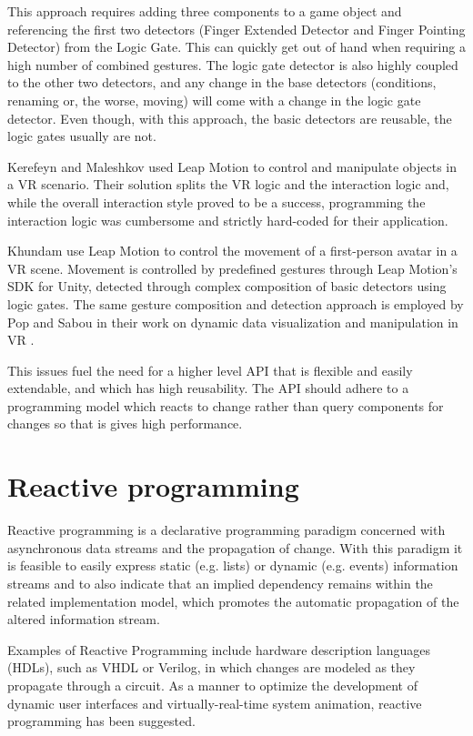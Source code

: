 \documentclass[12pt,a4paper,twoside]{report}
\begin{document}
This approach requires adding three components to a game object and referencing the first two detectors (Finger Extended Detector and Finger Pointing Detector) from the Logic Gate. This can quickly get out of hand when requiring a high number of combined gestures. The logic gate detector is also highly coupled to the other two detectors, and any change in the base detectors (conditions, renaming or, the worse, moving) will come with a change in the logic gate detector. Even though, with this approach, the basic detectors are reusable, the logic gates usually are not.

Kerefeyn and Maleshkov \cite{Kerefeyn} used Leap Motion to control and manipulate objects in a VR scenario. Their solution splits the VR logic and the interaction logic and, while the overall interaction style proved to be a success, programming the interaction logic was cumbersome and strictly hard-coded for their application.

Khundam \cite{Khundam} use Leap Motion to control the movement of a first-person avatar in a VR scene. Movement is controlled by predefined gestures through Leap Motion's SDK for Unity, detected through complex composition of basic detectors using logic gates. The same gesture composition and detection approach is employed by Pop and Sabou in their work on dynamic data visualization and manipulation in VR \cite{Pop}.

This issues fuel the need for a higher level API that is flexible and easily extendable, and which has high reusability. The API should adhere to a programming model which reacts to change rather than query components for changes so that is gives high performance.

\section{Reactive programming}
Reactive programming is a declarative programming paradigm concerned with asynchronous data streams and the propagation of change. With this paradigm it is feasible to easily express static (e.g. lists) or dynamic (e.g. events) information streams and to also indicate that an implied dependency remains within the related implementation model, which promotes the automatic propagation of the altered information stream.

Examples of Reactive Programming include hardware description languages (HDLs), such as VHDL or Verilog, in which changes are modeled as they propagate through a circuit. As a manner to optimize the development of dynamic user interfaces and virtually-real-time system animation, reactive programming has been suggested.
\end{document}
